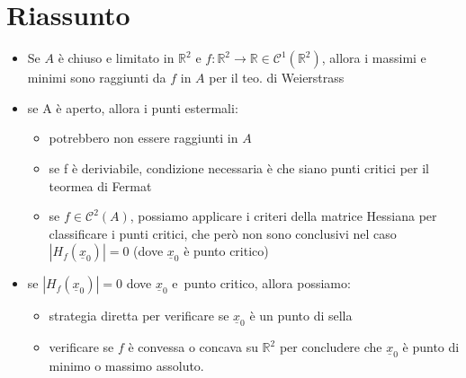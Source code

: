 \documentclass[12pt, a4paper]{report}
\begin{document}
\section{Riassunto}
\begin{itemize}
	\item Se $A$ è chiuso e limitato in $\mathbb{R}^2$ e $f : \mathbb{R}^2
		      \to \mathbb{R} \in \mathcal{C}^1(\mathbb{R}^2)$,
	      allora i massimi e minimi sono raggiunti da $f$ in $A$ per il teo.
	      di Weierstrass
	\item se A è aperto, allora i punti estermali:
	      \begin{itemize}
		      \item potrebbero non essere raggiunti in $A$
		      \item se f è deriviabile, condizione necessaria è che siano
		            punti critici per il teormea di Fermat
		      \item se $f \in \mathcal{C}^2(A)$, possiamo applicare i criteri
		            della matrice Hessiana per classificare i punti critici, che
		            però non sono conclusivi nel caso $|H_f(\underline{x}_0)| =
			            0$ (dove $\underline{x}_0$ è punto critico)
	      \end{itemize}
	\item se $|H_f(\underline{x}_0)| = 0$ dove $\underline{x}_0$ e\ punto
	      critico, allora possiamo:
	      \begin{itemize}
		      \item strategia diretta per verificare se $\underline{x}_0$ è un
		            punto di sella
		      \item verificare se $f$ è convessa o concava su $\mathbb{R}^2$ per
		            concludere che $\underline{x}_0$ è punto di minimo o massimo
		            assoluto.
	      \end{itemize}
\end{itemize}
\end{document}
